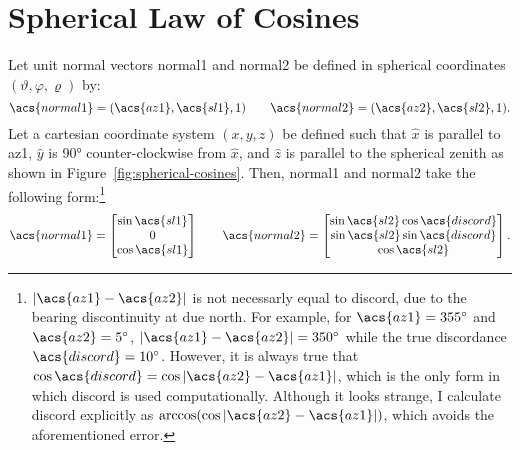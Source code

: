 \chapter{Spherical Law of Cosines}\label{app:spherical-cosines}
Let unit normal vectors \acs{normal1} and \acs{normal2} be defined in spherical coordinates $(\vartheta,\varphi,\varrho)$ by:
\begin{equation}
    \acs{normal1}=(\acs{az1},\acs{sl1},1)\qquad\acs{normal2}=(\acs{az2},\acs{sl2},1).
\end{equation}
Let a cartesian coordinate system $(x,y,z)$ be defined such that $\hat x$ is parallel to \acs{az1}, $\hat y$ is \ang{90} counter-clockwise from $\hat x$, and $\hat z$ is parallel to the spherical zenith as shown in Figure~\ref{fig:spherical-cosines}. Then, \acs{normal1} and \acs{normal2} take the following form:\footnote{$|\acs{az1}-\acs{az2}|$ is not necessarly equal to \acs{discord}, due to the bearing discontinuity at due north. For example, for $\acs{az1}=\ang{355}$ and $\acs{az2}=\ang{5}$, $|\acs{az1}-\acs{az2}|=\ang{350}$ while the true discordance $\acs{discord}=\ang{10}$. However, it is always true that $\cos\acs{discord}=\cos|\acs{az2}-\acs{az1}|$, which is the only form in which \acs{discord} is used computationally. Although it looks strange, I calculate \acs{discord} explicitly as $\arccos(\cos|\acs{az2}-\acs{az1}|)$, which avoids the aforementioned error.}
\begin{equation}
    \acs{normal1}=
    \begin{bmatrix}
        \sin\acs{sl1}\\
        0\\
        \cos\acs{sl1}
    \end{bmatrix}
    \qquad
    \acs{normal2}=
    \begin{bmatrix}
        \sin\acs{sl2}\cos\acs{discord}\\
        \sin\acs{sl2}\sin\acs{discord}\\
        \cos\acs{sl2}
    \end{bmatrix}.
\end{equation}

